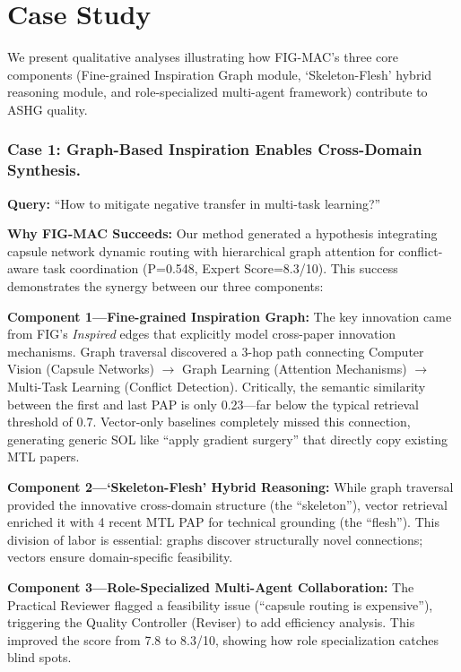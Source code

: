 \documentclass[runningheads]{llncs}
\begin{document}
\section{Case Study}
\label{sec:case_study}

We present qualitative analyses illustrating how FIG-MAC's three core components (Fine-grained Inspiration Graph module, `Skeleton-Flesh' hybrid reasoning module, and role-specialized multi-agent framework) contribute to ASHG quality.

\subsubsection{Case 1: Graph-Based Inspiration Enables Cross-Domain Synthesis.}
\label{sec:case1}

\textbf{Query:} ``How to mitigate negative transfer in multi-task learning?''

\textbf{Why FIG-MAC Succeeds:} Our method generated a hypothesis integrating capsule network dynamic routing with hierarchical graph attention for conflict-aware task coordination (P=0.548, Expert Score=8.3/10). This success demonstrates the synergy between our three components:

\textbf{Component 1---Fine-grained Inspiration Graph:} The key innovation came from FIG's \emph{Inspired} edges that explicitly model cross-paper innovation mechanisms. Graph traversal discovered a 3-hop path connecting Computer Vision (Capsule Networks) $\rightarrow$ Graph Learning (Attention Mechanisms) $\rightarrow$ Multi-Task Learning (Conflict Detection). Critically, the semantic similarity between the first and last PAP is only 0.23---far below the typical retrieval threshold of 0.7. Vector-only baselines completely missed this connection, generating generic SOL like ``apply gradient surgery'' that directly copy existing MTL papers.

\textbf{Component 2---`Skeleton-Flesh' Hybrid Reasoning:} While graph traversal provided the innovative cross-domain structure (the ``skeleton''), vector retrieval enriched it with 4 recent MTL PAP for technical grounding (the ``flesh''). This division of labor is essential: graphs discover structurally novel connections; vectors ensure domain-specific feasibility.

\textbf{Component 3---Role-Specialized Multi-Agent Collaboration:} The Practical Reviewer flagged a feasibility issue (``capsule routing is expensive''), triggering the Quality Controller (Reviser) to add efficiency analysis. This improved the score from 7.8 to 8.3/10, showing how role specialization catches blind spots.
\end{document}
